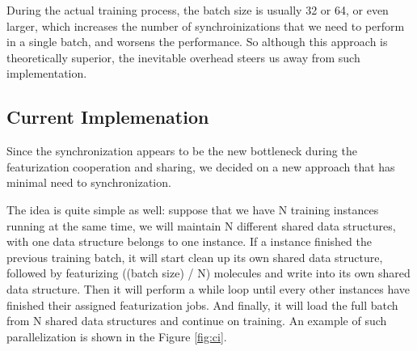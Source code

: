 \documentclass[conference]{IEEEtran}
\begin{document}
During the actual training process, the batch size is usually 32 or 64, or even larger, which increases the number of synchroinizations that we need to perform in a single batch, and worsens the performance. 
So although this approach is theoretically superior, the inevitable overhead steers us away from such implementation. 

\subsection{Current Implemenation} \label{subsec_ci}

Since the synchronization appears to be the new bottleneck during the featurization cooperation and sharing, we decided on a new approach that has minimal need to synchronization. 

The idea is quite simple as well: suppose that we have N training instances running at the same time, we will maintain N different shared data structures, with one data structure belongs to one instance. 
If a instance finished the previous training batch, it will start clean up its own shared data structure, followed by featurizing ((batch size) / N) molecules and write into its own shared data structure. 
Then it will perform a while loop until every other instances have finished their assigned featurization jobs. 
And finally, it will load the full batch from N shared data structures and continue on training. 
An example of such parallelization is shown in the Figure \ref{fig:ci}. 
\end{document}
